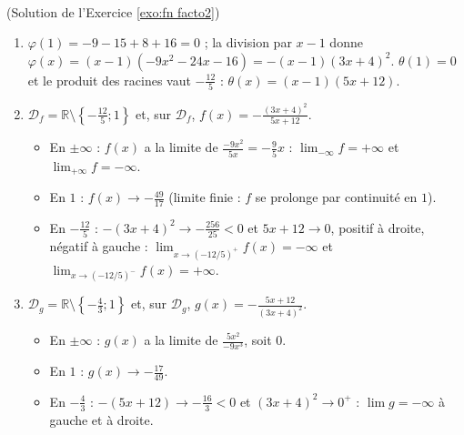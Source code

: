\begin{corrige}
\begin{sol} ~ \\
(Solution de l'Exercice \ref{exo:fn facto2})
\begin{enumerate}
\item $\varphi(1) = -9 - 15 + 8 + 16 = 0$ ; la division par $x - 1$ donne
      $\varphi(x) = (x-1)(-9x^2 - 24x - 16) = -(x-1)(3x+4)^2$.
      $\theta(1) = 0$ et le produit des racines vaut $-\frac{12}{5}$ : $\theta(x) = (x-1)(5x+12)$.
\item $\mathcal{D}_f = \mathbb{R} \setminus \left\{-\frac{12}{5} ; 1\right\}$ et, sur $\mathcal{D}_f$, $f(x) = -\frac{(3x+4)^2}{5x+12}$.
      \begin{itemize}
      \item En $\pm\infty$ : $f(x)$ a la limite de $\frac{-9x^2}{5x} = -\frac{9}{5}x$ : $\lim_{-\infty} f = +\infty$ et $\lim_{+\infty} f = -\infty$.
      \item En $1$ : $f(x) \to -\frac{49}{17}$ (limite finie : $f$ se prolonge par continuit\'e en $1$).
      \item En $-\frac{12}{5}$ : $-(3x+4)^2 \to -\frac{256}{25} < 0$ et $5x + 12 \to 0$, positif \`a droite, n\'egatif \`a gauche :
            $\lim_{x\to(-12/5)^+} f(x) = -\infty$ et $\lim_{x\to(-12/5)^-} f(x) = +\infty$.
      \end{itemize}
\item $\mathcal{D}_g = \mathbb{R} \setminus \left\{-\frac{4}{3} ; 1\right\}$ et, sur $\mathcal{D}_g$, $g(x) = -\frac{5x+12}{(3x+4)^2}$.
      \begin{itemize}
      \item En $\pm\infty$ : $g(x)$ a la limite de $\frac{5x^2}{-9x^3}$, soit $0$.
      \item En $1$ : $g(x) \to -\frac{17}{49}$.
      \item En $-\frac{4}{3}$ : $-(5x + 12) \to -\frac{16}{3} < 0$ et $(3x+4)^2 \to 0^+$ : $\lim g = -\infty$ \`a gauche et \`a droite.
      \end{itemize}
\end{enumerate}
\end{sol}


\end{corrige}
